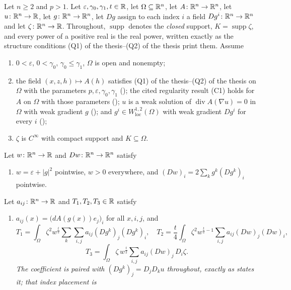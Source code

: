 \begin{helper}
Let $n\ge2$ and $p>1$.  Let $\varepsilon,\gamma_0,\gamma_1,t\in\mathbb{R}$, let
$\Omega\subseteq\mathbb{R}^n$, let $A\colon\mathbb{R}^n\to\mathbb{R}^n$, let $u\colon\mathbb{R}^n\to\mathbb{R}$, let
$g\colon\mathbb{R}^n\to\mathbb{R}^n$, let $Dg$ assign to each index $i$ a field
$Dg^i\colon\mathbb{R}^n\to\mathbb{R}^n$ and let $\zeta\colon\mathbb{R}^n\to\mathbb{R}$.  Throughout,
$\operatorname{supp}$ denotes the \emph{closed} support, $K=\operatorname{supp}\zeta$,
and every power of a positive real is the real power, written exactly as the
structure conditions (Q1) of the thesis--(Q2) of the thesis print them.  Assume
\begin{enumerate}
\item[(H1)] $0<\varepsilon$, $0<\gamma_0$, $\gamma_0\le\gamma_1$, $\Omega$ is
  open and nonempty;
\item[(H2)] the field $(x,z,h)\mapsto A(h)$ satisfies
  (Q1) of the thesis--(Q2) of the thesis on $\Omega$ with the parameters
  $p,\varepsilon,\gamma_0,\gamma_1$ (); the cited
  regularity result (C1) holds for $A$ on $\Omega$ with those parameters
  (); $u$ is a weak solution of
  $\operatorname{div}A(\nabla u)=0$ in $\Omega$ with weak gradient $g$
  (); and $g^i\in W^{1,2}_{\mathrm{loc}}(\Omega)$
  with weak gradient $Dg^i$ for every $i$ ();
\item[(H3)] $\zeta$ is $C^\infty$ with compact support and $K\subseteq\Omega$.
\end{enumerate}
Let $w\colon\mathbb{R}^n\to\mathbb{R}$ and $Dw\colon\mathbb{R}^n\to\mathbb{R}^n$ satisfy
\begin{enumerate}
\item[(H4)] $w=\varepsilon+|g|^2$ pointwise, $w>0$ everywhere, and
  $(Dw)_i=2\sum_kg^k(Dg^k)_i$ pointwise.
\end{enumerate}
Let $a_{ij}\colon\mathbb{R}^n\to\mathbb{R}$ and $T_1,T_2,T_3\in\mathbb{R}$ satisfy
\begin{enumerate}
\item[(H5)] $a_{ij}(x)=\bigl(dA(g(x))e_j\bigr)_i$ for all $x,i,j$, and
  \[
  T_1=\int_\Omega\zeta^2w^{\frac t2}\sum_k\sum_{i,j}a_{ij}(Dg^k)_j(Dg^k)_i,
  \quad
  T_2=\frac t4\int_\Omega\zeta^2w^{\frac t2-1}\sum_{i,j}a_{ij}(Dw)_j(Dw)_i,
  \]
  \[
  T_3=\int_\Omega\zeta\,w^{\frac t2}\sum_{i,j}a_{ij}(Dw)_j\,D_i\zeta .
  \]
  \emph{The coefficient is paired with $(Dg^k)_j=D_jD_ku$ throughout, exactly as
   states it; that index placement is
}
\end{enumerate}
\end{helper}
